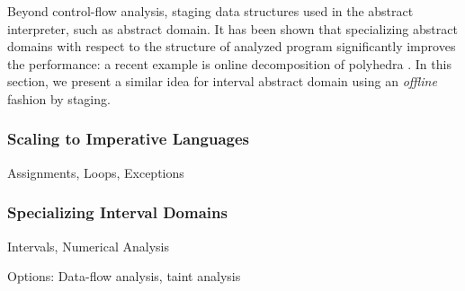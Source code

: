 Beyond control-flow analysis, staging data structures used in the abstract interpreter, such as abstract domain.
It has been shown that specializing abstract domains with respect to the structure of analyzed program significantly 
improves the performance: a recent example is online decomposition of polyhedra \cite{DBLP:conf/popl/SinghPV17, Singh:2017:PCD:3177123.3158143}.
In this section, we present a similar idea for interval abstract domain using an \textit{offline} fashion by staging.

\subsubsection{Scaling to Imperative Languages}

Assignments, Loops, Exceptions

\subsubsection{Specializing Interval Domains}

Intervals, Numerical Analysis

Options: Data-flow analysis, taint analysis
